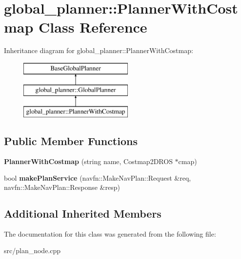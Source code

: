 \hypertarget{classglobal__planner_1_1_planner_with_costmap}{}\section{global\+\_\+planner\+:\+:Planner\+With\+Costmap Class Reference}
\label{classglobal__planner_1_1_planner_with_costmap}
Inheritance diagram for global\+\_\+planner\+:\+:Planner\+With\+Costmap\+:\begin{figure}[H]
\begin{center}
\leavevmode
\includegraphics[height=3.000000cm]{classglobal__planner_1_1_planner_with_costmap}
\end{center}
\end{figure}
\subsection*{Public Member Functions}
\begin{DoxyCompactItemize}
\item 
\mbox{\label{classglobal__planner_1_1_planner_with_costmap_abf6efea3cec2f9f41ae7104005f777c7}} 
{\bfseries Planner\+With\+Costmap} (string name, Costmap2\+D\+R\+OS $\ast$cmap)
\item 
\mbox{\label{classglobal__planner_1_1_planner_with_costmap_a735f4750a1e88ab01b22a4d12d8dfc0d}} 
bool {\bfseries make\+Plan\+Service} (navfn\+::\+Make\+Nav\+Plan\+::\+Request \&req, navfn\+::\+Make\+Nav\+Plan\+::\+Response \&resp)
\end{DoxyCompactItemize}
\subsection*{Additional Inherited Members}


The documentation for this class was generated from the following file\+:\begin{DoxyCompactItemize}
\item 
src/plan\+\_\+node.\+cpp\end{DoxyCompactItemize}
